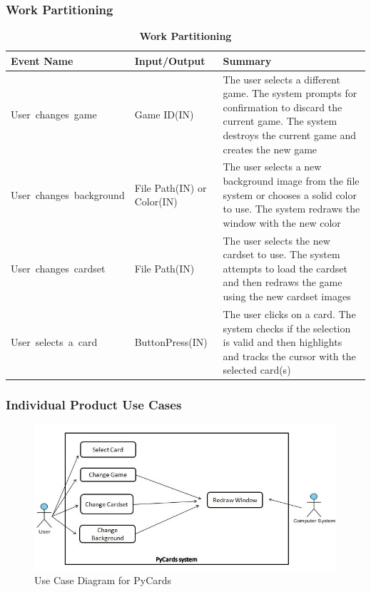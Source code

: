 \documentclass[12pt, titlepage]{article}
\begin{document}
		\subsubsection{Work Partitioning}
		\begin{table}[!htp]
		\caption{\bf Work Partitioning}
			\begin{tabularx}{\textwidth}{|l|X|X|}
			\toprule {\bf Event Name} & {\bf Input/Output} & {\bf Summary}\\
			\midrule			
			\mbox{User changes game} & Game ID(IN) & The user selects a different game.
			The system prompts for confirmation to discard the current game. The system
			destroys the current game and creates the new game\\
			\hline
			\mbox{User changes background} & File Path(IN) \newline or Color(IN) & 
			The user selects a new background image from the file system or chooses
			a solid color to use. The system redraws the window with the new color\\
			\hline
			\mbox{User changes cardset} & File Path(IN) & The user selects the new
			cardset to use. The system attempts to load the cardset and then redraws the
			game using the new cardset images\\
			\hline
			\mbox{User selects a card} & ButtonPress(IN) & The user clicks on a card. The
			system checks if the selection is valid and then highlights and tracks the
			cursor with the selected card(s)\\
			\bottomrule
			\end{tabularx}
		\end{table}
		\subsubsection{Individual Product Use Cases}
		\begin{figure}[h!]
			\includegraphics[scale=0.9]{use_case}
			\caption{Use Case Diagram for PyCards}
			\label{usecase}
		\end{figure}
\end{document}

